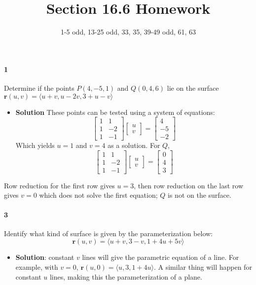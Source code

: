 \documentclass{article}
\title{Section 16.6 Homework}
\author{1-5 odd, 13-25 odd, 33, 35, 39-49 odd, 61, 63}
\date{}
\begin{document}
    \maketitle
    
    \paragraph{1} Determine if the points $P(4,-5,1)$ and $Q(0,4,6)$ lie on the surface $\mathbf{r}(u,v) = \langle u+v, u-2v, 3+u-v \rangle$
    \begin{itemize}
        \item \textbf{Solution} These points can be tested using a system of equations:
        \[\begin{bmatrix}1&1\\1&-2\\1&-1\end{bmatrix}\begin{bmatrix}u\\v\end{bmatrix} = \begin{bmatrix}4\\-5\\-2\end{bmatrix}\]
        Which yields $u=1$ and $v=4$ as a solution. For $Q$,
        \[\begin{bmatrix}1&1\\1&-2\\1&-1\end{bmatrix}\begin{bmatrix}u\\v\end{bmatrix} = \begin{bmatrix}0\\4\\3\end{bmatrix}\]
    \end{itemize}
    Row reduction for the first row gives $u=3$, then row reduction on the last row gives $v=0$ which does not solve the first equation; $Q$ is not on the surface.
    
    \paragraph{3} Identify what kind of surface is given by the parameterization below:
    \[ \mathbf{r}(u,v) = \langle u+v, 3-v, 1+4u+5v \rangle \]
    \begin{itemize}
        \item \textbf{Solution}: constant $v$ lines will give the parametric equation of a line. For example, with $v = 0$, $\mathbf{r}(u,0) = \langle u, 3, 1+4u \rangle$. A similar thing will happen for constant $u$ lines, making this the parameterization of a plane.
    \end{itemize}
    
\end{document}
